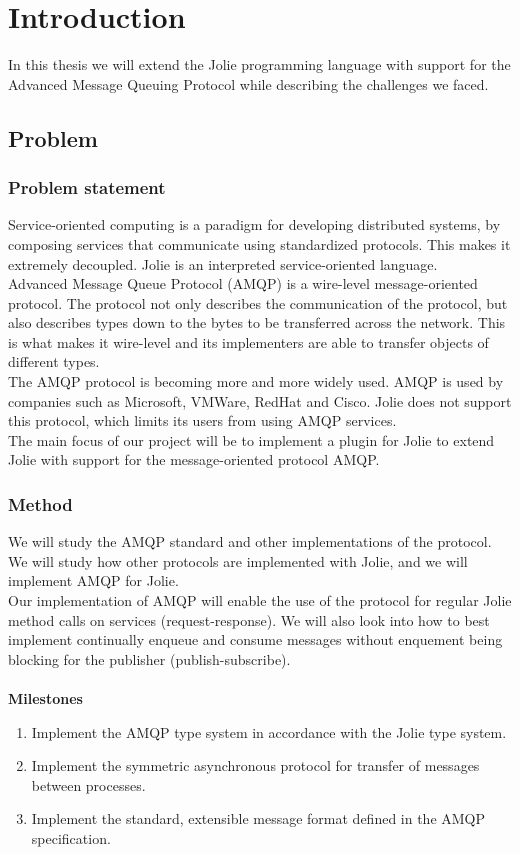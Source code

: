 \section{Introduction}
In this thesis we will extend the Jolie programming language with support for the Advanced Message Queuing Protocol while describing the challenges we faced.
\subsection{Problem}
\subsubsection{Problem statement}
Service-oriented computing is a paradigm for developing distributed systems, by composing services that communicate using standardized protocols. This makes it extremely decoupled. Jolie is an interpreted service-oriented language.\\
Advanced Message Queue Protocol (AMQP) is a wire-level message-oriented protocol. The protocol not only describes the communication of the protocol, but also describes types down to the bytes to be transferred across the network. This is what makes it wire-level and its implementers are able to transfer objects of different types.\\
The AMQP protocol is becoming more and more widely used. AMQP is used by companies such as Microsoft, VMWare, RedHat and Cisco. Jolie does not support this protocol, which limits its users from using AMQP services.\\
The main focus of our project will be to implement a plugin for Jolie to extend Jolie with support for the message-oriented protocol AMQP.
\subsubsection{Method}
We will study the AMQP standard and other implementations of the protocol. We will study how other protocols are implemented with Jolie, and we will implement AMQP for Jolie.\\
Our implementation of AMQP will enable the use of the protocol for regular Jolie method calls on services (request-response). We will also look into how to best implement continually enqueue and consume messages without enquement being blocking for the publisher (publish-subscribe).\\
\\\textbf{Milestones}
\begin{enumerate}
\item Implement the AMQP type system in accordance with the Jolie type system.
\item Implement the symmetric asynchronous protocol for transfer of messages between processes.
\item Implement the standard, extensible message format defined in the AMQP specification.
\end{enumerate}

